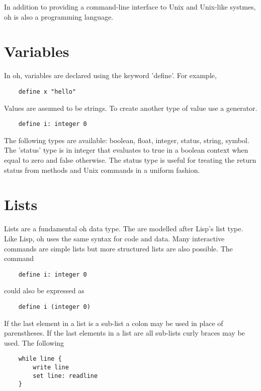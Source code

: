 \documentclass[12pt]{book}
\begin{document}
In addition to providing a command-line interface to Unix and
Unix-like systmes, oh is also a programming language.


\section{Variables}

In oh, variables are declared using the keyword 'define'. For example,

\begin{lstlisting}
	define x "hello"
\end{lstlisting}

Values are assumed to be strings. To create another type of value
use a generator.

\begin{lstlisting}
	define i: integer 0
\end{lstlisting}

The following types are available: boolean, float, integer, status,
string, symbol. The 'status' type is in integer that evaluates to
true in a boolean context when equal to zero and false otherwise.
The status type is useful for treating the return status from methods
and Unix commands in a uniform fashion.


\section{Lists}

Lists are a fundamental oh data type. The are modelled after Lisp's
list type. Like Lisp, oh uses the same syntax for code and data.
Many interactive commands are simple lists but more structured lists
are also possible. The command

\begin{lstlisting}
	define i: integer 0
\end{lstlisting}

could also be expressed as

\begin{lstlisting}
	define i (integer 0)
\end{lstlisting}

If the last element in a list is a sub-list a colon may be used in
place of parenstheses. If the last elements in a list are all
sub-lists curly braces may be used. The following

\begin{lstlisting}
	while line {
		write line
		set line: readline
	}
\end{lstlisting}
\end{document}
